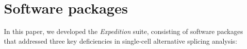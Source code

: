 \pagebreak
\section{Software packages}


In this paper, we developed the \emph{Expedition} suite, consisting of  software packages that addressed three key deficiencies in single-cell alternative splicing analysis:

